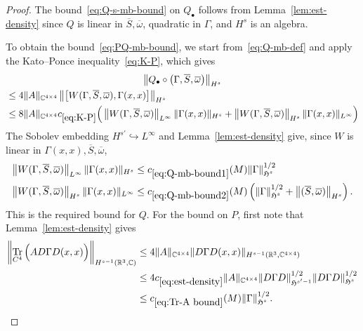 \documentclass[AHL,Unicode,longabstracts,published]{cedram}
\DeclareMathOperator{\tr}{Tr}
\newcommand\R{\mathbb{R}}
\newcommand\C{\mathbb{C}}
\newcommand{\gH}{\mathfrak{H}}
\begin{document}
\begin{proof}
The bound~\eqref{eq:Q-s-mb-bound} on $Q_\bullet$ follows from Lemma~\ref{lem:est-density} since $Q$ is linear in $\overline{S}, \overline{\omega}$, quadratic in $\Gamma$, and $H^s$ is an algebra.

To obtain the bound~\eqref{eq:PQ-mb-bound}, we start from~\eqref{eq:Q-mb-def} and apply the Kato--Ponce inequality~\eqref{eq:K-P}, which gives
\begin{multline*}
\left\|Q_\bullet\circ\left(\Gamma, \overline{S}, \overline{\omega}\right)\right\|_{H^s}\\
\begin{aligned}
&\leq 4 \|A\|_{\C^{4\times 4}} \left\|\left[W(\Gamma, \overline{S}, \overline{\omega}),\Gamma(x,x)\right]\right\|_{H^s} \\
&\leq 8 \|A\|_{\C^{4\times 4}} c_{\eqref{eq:K-P}}
\Big(\left\|W(\Gamma, \overline{S}, \overline{\omega})\right\|_{L^\infty} \|\Gamma(x,x)\|_{H^s} 
+ \left\|W(\Gamma, \overline{S}, \overline{\omega})\right\|_{H^s}\|\Gamma(x,x)\|_{L^\infty}\Big)
\end{aligned}
\end{multline*}
The Sobolev embedding $H^{s'}\hookrightarrow L^\infty$ and Lemma~\ref{lem:est-density} give, since $W$ is linear in $\Gamma(x,x), \overline{S}, \overline{\omega}$,
\begin{align}
\left\|W(\Gamma, \overline{S}, \overline{\omega})\right\|_{L^\infty} \|\Gamma(x,x)\|_{H^s} &\leq c_{\eqref{eq:Q-mb-bound1}}(M)\|\Gamma\|_{\gH^{s}}^{1/2} \label{eq:Q-mb-bound1}
\\
\left\|W(\Gamma, \overline{S}, \overline{\omega})\right\|_{H^s}\|\Gamma(x,x)\|_{L^\infty} &\leq c_{\eqref{eq:Q-mb-bound2}}(M)\left(\|\Gamma\|_{\gH^{s}}^{1/2} + \left\|(\overline{S}, \overline{\omega})\right\|_{H^s}\right)\label{eq:Q-mb-bound2}
.
\end{align}
This is the required bound for $Q$. For the bound on $P$, first note that Lemma~\ref{lem:est-density} gives
\begin{equation}\label{eq:Tr-A bound}
\begin{split}
\left\|\tr_{C^4}\Big(A D \Gamma D(x,x)\Big)\right\|_{H^{s-1}\left(\R^3,\C\right)} &\leq 4 \|A\|_{\C^{4\times 4}}\|D \Gamma D(x,x)\|_{H^{s-1}\left(\R^3, \C^{4\times 4}\right)} \\
&\leq 4 c_{\eqref{eq:est-density}} \|A\|_{\C^{4\times 4}} \|D \Gamma D\|_{\gH^{s'-1}}^{1/2}\|D \Gamma D\|_{\gH^{s}}^{1/2}\\
&\leq c_{\eqref{eq:Tr-A bound}}(M) \|\Gamma \|_{\gH^{s}}^{1/2} 
.
\end{split}

\end{equation}
\end{proof}
\end{document}
